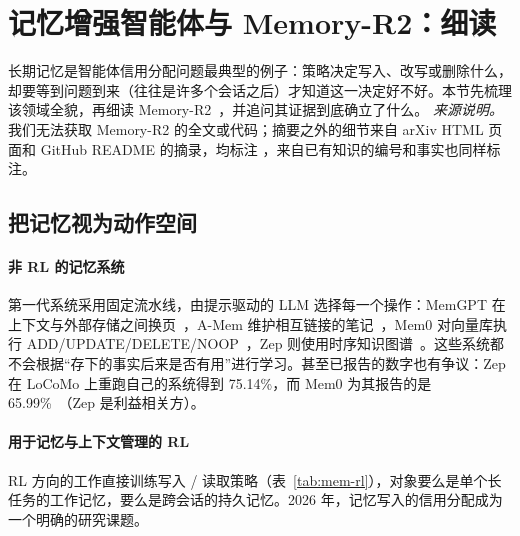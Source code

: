 \section{记忆增强智能体与 Memory-R2：细读}\label{sec:memory}

长期记忆是智能体信用分配问题最典型的例子：策略决定写入、改写或删除什么，却要等到问题到来（往往是许多个会话之后）才知道这一决定好不好。本节先梳理该领域全貌，再细读 Memory-R2~\citep{yan2026memory}，并追问其证据到底确立了什么。
\emph{来源说明。}我们无法获取 Memory-R2 的全文或代码；摘要之外的细节来自 arXiv HTML 页面和 GitHub README 的摘录，均标注 \unverified，来自已有知识的编号和事实也同样标注。

\subsection{把记忆视为动作空间}

\paragraph{非 RL 的记忆系统}
第一代系统采用固定流水线，由提示驱动的 LLM 选择每一个操作：MemGPT 在上下文与外部存储之间换页~\citep{packer2023memgpt}，A-Mem 维护相互链接的笔记~\citep{xu2025amem}，Mem0 对向量库执行 ADD\slash UPDATE\slash DELETE\slash NOOP~\citep{chhikara2025mem0}，Zep 则使用时序知识图谱~\citep{rasmussen2025zep}\unverified。这些系统都不会根据“存下的事实后来是否有用”进行学习。甚至已报告的数字也有争议：Zep 在 LoCoMo 上重跑自己的系统得到 75.14\%，而 Mem0 为其报告的是 65.99\%~\citep{zepmem0}（Zep 是利益相关方）。

\paragraph{用于记忆与上下文管理的 RL}
RL 方向的工作直接训练写入 / 读取策略（表~\ref{tab:mem-rl}），对象要么是单个长任务的工作记忆，要么是跨会话的持久记忆。2026 年，记忆写入的信用分配成为一个明确的研究课题。

